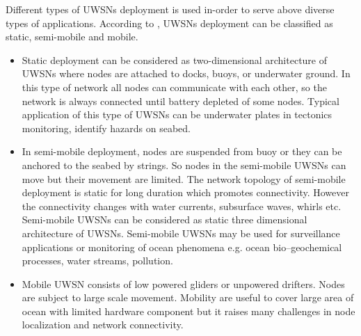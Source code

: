 \documentclass[12pt]{article}
\begin{document}
Different types of UWSNs deployment is used in-order to serve above diverse types of applications. According to \cite{heidemann2012underwater}, UWSNs deployment can be classified as static, semi-mobile and mobile.
\begin{itemize}
\item Static deployment can be considered as two-dimensional architecture of UWSNs where nodes are attached to docks,  buoys, or underwater ground. In this type of network all nodes can communicate with each other, so the network is always connected until battery depleted of some nodes. Typical application of this type of UWSNs can be underwater plates in tectonics monitoring\cite{freitag2002acoustic}, identify hazards on seabed.
\item In semi-mobile deployment, nodes are suspended from buoy or they can be anchored to the seabed by strings.  So nodes in the semi-mobile UWSNs can move but their movement are limited. The network topology of semi-mobile deployment is static for long duration which promotes connectivity. However the connectivity changes with water currents, subsurface waves, whirls etc. Semi-mobile UWSNs can be considered as static three dimensional architecture of UWSNs. Semi-mobile UWSNs may be used for surveillance applications or monitoring of ocean phenomena e.g. ocean bio–geochemical processes, water streams, pollution.

\item Mobile UWSN consists of low powered gliders or unpowered drifters. Nodes are subject to large scale movement. Mobility are useful to cover large area of ocean with limited hardware component but it raises many challenges in node localization and network connectivity.
\end{itemize}
 
\end{document}
